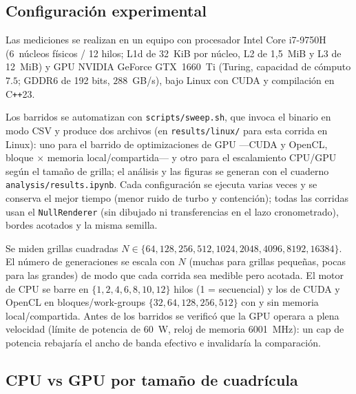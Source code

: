 \documentclass[
	spanish,
	letterpaper, oneside
]{article}
\begin{document}
\subsection{Configuración experimental}
\label{sec:experimentos}

Las mediciones se realizan en un equipo con procesador Intel Core i7-9750H
(6~núcleos físicos / 12 hilos; L1d de 32~KiB por núcleo, L2 de 1{,}5~MiB y L3 de
12~MiB) y GPU NVIDIA GeForce GTX~1660~Ti (Turing, capacidad de cómputo $7{.}5$;
GDDR6 de 192 bits, $288$~GB/s), bajo Linux con CUDA y compilación en C\texttt{++}23.

Los barridos se automatizan con \texttt{scripts/sweep.sh}, que invoca el binario en
modo CSV y produce dos archivos (en \texttt{results/linux/} para esta corrida en
Linux): uno para el barrido de optimizaciones de GPU ---CUDA y OpenCL, bloque
$\times$ memoria local/compartida--- y otro para el escalamiento CPU/GPU según el
tamaño de grilla; el análisis y las figuras se generan con el cuaderno
\texttt{analysis/results.ipynb}. Cada configuración se ejecuta varias
veces y se conserva el mejor tiempo (menor ruido de turbo y
contención); todas las corridas usan el \texttt{NullRenderer} (sin dibujado ni
transferencias en el lazo cronometrado), bordes acotados y la misma semilla.

Se miden grillas cuadradas $N \in \{64, 128, 256, 512, 1024, 2048, 4096, 8192,
16384\}$. El número de generaciones se escala con $N$ (muchas para grillas pequeñas,
pocas para las grandes) de modo que cada corrida sea medible pero acotada. El motor
de CPU se barre en $\{1,2,4,6,8,10,12\}$ hilos (1 = secuencial) y los de CUDA y
OpenCL en bloques/work-groups $\{32,64,128,256,512\}$ con y sin memoria
local/compartida. Antes de los barridos
se verificó que la GPU operara a plena velocidad (límite de potencia de 60~W, reloj
de memoria 6001~MHz): un cap de potencia rebajaría el ancho de banda efectivo
e invalidaría la comparación.

\subsection{CPU vs GPU por tamaño de cuadrícula}
\label{sec:res-cpu-gpu}
\end{document}
